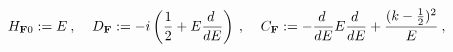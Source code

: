 \begin{equation}
H_{{\bf F}0} := E \:,\:\:\:\:\:
D_{\bf F} := -i\left(\frac{1}{2} + E\frac{d \:}{d E}\right)\:, \:\:\:\:\:
C_{\bf F} := -\frac{d \:}{d E} E\frac{d \:}{d E} +
\frac{(k-\frac{1}{2})^2}{E}\:,\label{ge3F}  
\end{equation} 
